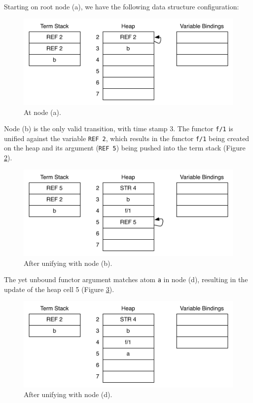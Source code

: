 Starting on root node (a), we have the following data structure configuration:

\begin{figure}[H]
  \centering
    \includegraphics[scale=0.6]{collect_variable1.pdf}
  \caption{At node (a).}
  \label{fig:collect_variable1}
\end{figure}

Node (b) is the only valid transition, with time stamp 3.
The functor \texttt{f/1} is unified against the variable \texttt{REF 2},
which results in the functor \texttt{f/1} being created on the heap
and its argument (\texttt{REF 5}) being pushed into the term stack
(Figure \ref{fig:collect_variable2}).

\begin{figure}[H]
  \centering
    \includegraphics[scale=0.6]{collect_variable2.pdf}
  \caption{After unifying with node (b).}
  \label{fig:collect_variable2}
\end{figure}

The yet unbound functor argument matches atom \texttt{a} in node (d),
resulting in the update of the heap cell 5 (Figure \ref{fig:collect_variable3}).

\begin{figure}[H]
  \centering
    \includegraphics[scale=0.6]{collect_variable3.pdf}
  \caption{After unifying with node (d).}
  \label{fig:collect_variable3}
\end{figure}


